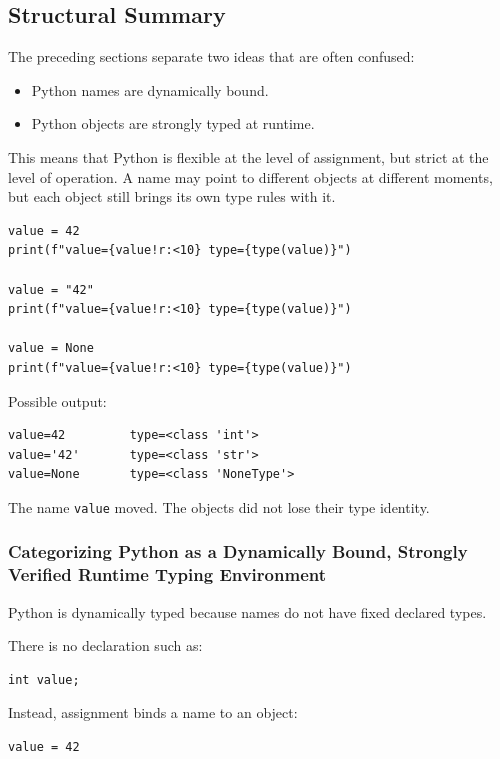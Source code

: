 \subsection{Structural Summary}

The preceding sections separate two ideas that are often confused:

\begin{itemize}
    \item Python names are dynamically bound.
    \item Python objects are strongly typed at runtime.
\end{itemize}

This means that Python is flexible at the level of assignment, but strict at the level of operation. A name may point to different objects at different moments, but each object still brings its own type rules with it.

\begin{verbatim}
value = 42
print(f"value={value!r:<10} type={type(value)}")

value = "42"
print(f"value={value!r:<10} type={type(value)}")

value = None
print(f"value={value!r:<10} type={type(value)}")
\end{verbatim}

Possible output:

\begin{verbatim}
value=42         type=<class 'int'>
value='42'       type=<class 'str'>
value=None       type=<class 'NoneType'>
\end{verbatim}

The name \texttt{value} moved. The objects did not lose their type identity.

\subsubsection{Categorizing Python as a Dynamically Bound, Strongly Verified Runtime Typing Environment}

Python is dynamically typed because names do not have fixed declared types.

There is no declaration such as:

\begin{verbatim}
int value;
\end{verbatim}

Instead, assignment binds a name to an object:

\begin{verbatim}
value = 42
\end{verbatim}

